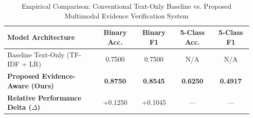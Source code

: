 \begin{table}[ht]
\centering
\caption{Empirical Comparison: Conventional Text-Only Baseline vs. Proposed Multimodal Evidence Verification System}
\label{tab:main_results}
\begin{tabular}{lcccc}
\hline
\textbf{Model Architecture} & \textbf{Binary Acc.} & \textbf{Binary F1} & \textbf{5-Class Acc.} & \textbf{5-Class F1} \\
\hline
Baseline Text-Only (TF-IDF + LR) & 0.7500 & 0.7500 & N/A & N/A \\
\textbf{Proposed Evidence-Aware (Ours)} & \textbf{0.8750} & \textbf{0.8545} & \textbf{0.6250} & \textbf{0.4917} \\
\hline
\textbf{Relative Performance Delta ($\Delta$)} & +0.1250 & +0.1045 & --- & --- \\
\hline
\end{tabular}
\end{table}
